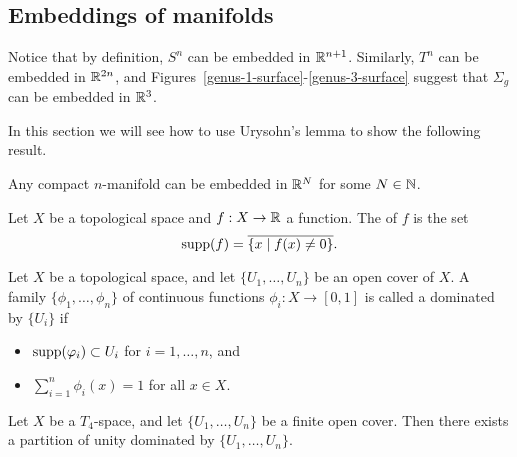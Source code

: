 \subsection{Embeddings of manifolds}
Notice that by definition, $S^n$ can be embedded in $\mathbb{R}^{n+1}$. Similarly, $T^n$ can be embedded in $\mathbb{R}^{2n}$, and Figures~\ref{genus-1-surface}-\ref{genus-3-surface} suggest that $\Sigma_g$ can be embedded in $\mathbb{R}^3$.

In this section we will see how to use Urysohn's lemma to show the following result.
\begin{thm}
  \label{embedding-of-manifolds}
  Any compact $n$-manifold can be embedded in $\mathbb{R}^N$ for some $N \in \mathbb{N}$.
\end{thm}
\begin{defn}
  Let $X$ be a topological space and $f : X \to \mathbb{R}$ a function. The  of $f$ is the set
  \[
    \operatorname{supp}(f) = \overline{\{x \mid f(x) \not= 0\}}.
  \]
\end{defn}
\begin{defn}
  Let $X$ be a topological space, and let $\{U_1, \dots, U_n\}$ be an open cover of $X$. A family $\{\phi_1,\dots,\phi_n\}$ of continuous functions $\phi_i : X \to [0,1]$ is called a  dominated by $\{U_i\}$ if
  \begin{itemize}
    \item $\operatorname{supp}(\varphi_i) \subset U_i$ for $i = 1, \dots, n$, and
    \item $\sum_{i=1}^n \phi_i(x) = 1$ for all $x \in X$.
  \end{itemize}
\end{defn}
\begin{thm}
  \label{t4-partition-of-unity}
  Let $X$ be a $T_4$-space, and let $\{U_1, \dots, U_n\}$ be a finite open cover. Then there exists a partition of unity dominated by $\{U_1,\dots,U_n\}$.
\end{thm}
